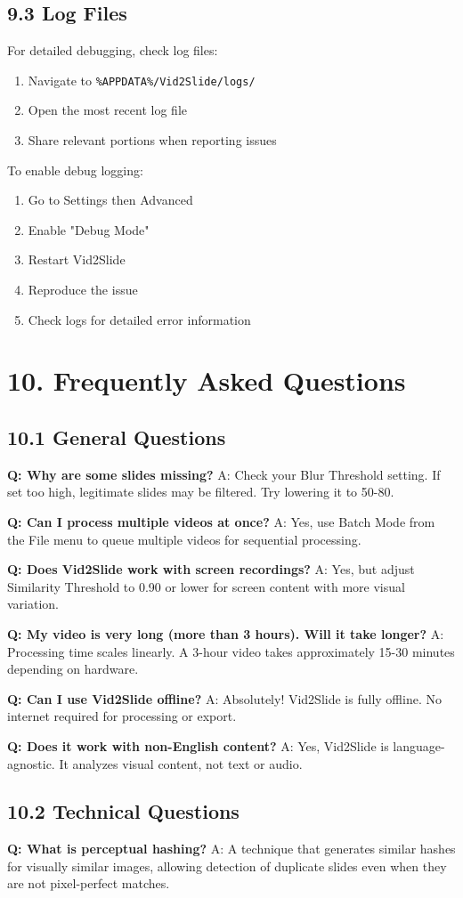 \documentclass[12pt,a4paper]{article}
\newcommand{\sectionTitle}[1]{\section*{#1}}
\newcommand{\subsectionTitle}[1]{\subsection*{#1}}
\newcommand{\code}[1]{\texttt{#1}}
\begin{document}
\subsectionTitle{9.3 Log Files}

For detailed debugging, check log files:
\begin{enumerate}
    \item Navigate to \code{\%APPDATA\%/Vid2Slide/logs/}
    \item Open the most recent log file
    \item Share relevant portions when reporting issues
\end{enumerate}

To enable debug logging:
\begin{enumerate}
    \item Go to Settings then Advanced
    \item Enable "Debug Mode"
    \item Restart Vid2Slide
    \item Reproduce the issue
    \item Check logs for detailed error information
\end{enumerate}

\newpage

\sectionTitle{10. Frequently Asked Questions}

\subsectionTitle{10.1 General Questions}

\textbf{Q: Why are some slides missing?}
A: Check your Blur Threshold setting. If set too high, legitimate slides may be filtered. Try lowering it to 50-80.

\textbf{Q: Can I process multiple videos at once?}
A: Yes, use Batch Mode from the File menu to queue multiple videos for sequential processing.

\textbf{Q: Does Vid2Slide work with screen recordings?}
A: Yes, but adjust Similarity Threshold to 0.90 or lower for screen content with more visual variation.

\textbf{Q: My video is very long (more than 3 hours). Will it take longer?}
A: Processing time scales linearly. A 3-hour video takes approximately 15-30 minutes depending on hardware.

\textbf{Q: Can I use Vid2Slide offline?}
A: Absolutely! Vid2Slide is fully offline. No internet required for processing or export.

\textbf{Q: Does it work with non-English content?}
A: Yes, Vid2Slide is language-agnostic. It analyzes visual content, not text or audio.

\subsectionTitle{10.2 Technical Questions}

\textbf{Q: What is perceptual hashing?}
A: A technique that generates similar hashes for visually similar images, allowing detection of duplicate slides even when they are not pixel-perfect matches.
\end{document}
